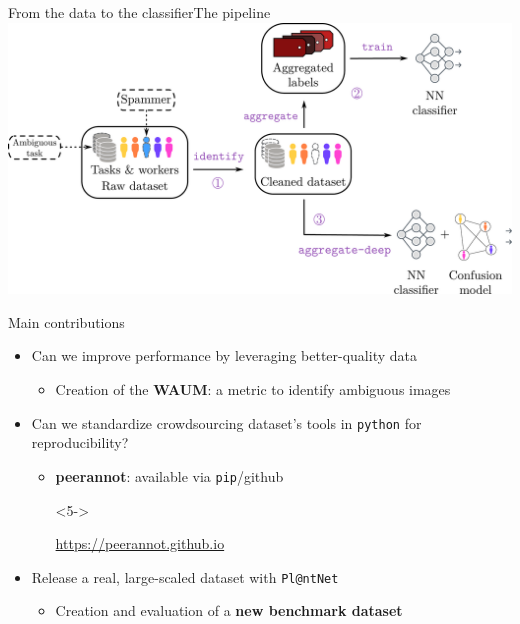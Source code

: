 \begin{frame}{From the data to the classifier}{The pipeline}
\includegraphics[width=\textwidth]{./images/strategies_crowd_data.pdf}
\end{frame}

\begin{frame}{Main contributions}{}

\begin{itemize}[itemsep=20pt]
    \item<1-> Can we improve performance by leveraging better-quality data
    \begin{itemize}
        \item<4-> Creation of the \textbf{WAUM}: a metric to identify ambiguous images %
    \end{itemize}
    \item<2-> Can we standardize crowdsourcing dataset's tools in \texttt{python} for reproducibility?
        \begin{itemize}
            \item<5-> \textbf{peerannot}: available via \texttt{pip}/github %
            \begin{onlyenv}<5->
                \begin{center}
                    \url{https://peerannot.github.io}
                \end{center}
            \end{onlyenv}
        \end{itemize}
    \item<3-> Release a real, large-scaled dataset with \texttt{Pl@ntNet}
        \begin{itemize}
            \item<6-> Creation and evaluation of a \textbf{new benchmark dataset}
        \end{itemize}
\end{itemize}

\end{frame}

